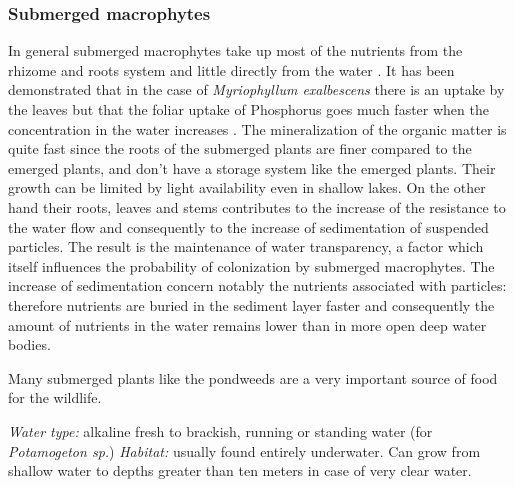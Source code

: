\subsubsection*{Submerged macrophytes}
In general submerged macrophytes take up most of the nutrients from the rhizome and roots system and
little directly from the water \citep{Eugelink,GraneliSolander}. It has been demonstrated
that in the case of \emph{Myriophyllum exalbescens} there is an uptake by the leaves but that the foliar uptake
of Phosphorus goes much faster when the concentration in the water increases \citep{MarteHartman}.
The mineralization of the organic matter is quite fast since the roots of the submerged plants are
finer compared to the emerged plants, and don't have a storage system like the emerged plants.
Their growth can be limited by light availability even in shallow lakes. On the other hand their
roots, leaves and stems contributes to the increase of the resistance to the water flow and consequently
to the increase of sedimentation of suspended particles. The result is the maintenance of water
transparency, a factor which itself influences the probability of colonization by submerged macrophytes.
The increase of sedimentation concern notably the nutrients associated with particles: therefore
nutrients are buried in the sediment layer faster and consequently the amount of nutrients in the
water remains lower than in more open deep water bodies.

Many submerged plants like the pondweeds are a very important source of food for the wildlife.

\emph{Water type:} alkaline fresh to brackish, running or standing water (for \emph{Potamogeton sp.})\newline
\emph{Habitat:} usually found entirely underwater. Can grow from shallow water to depths greater than ten
meters in case of very clear water.

